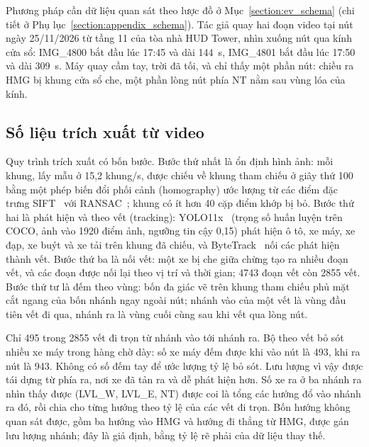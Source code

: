 \documentclass[../main.tex]{subfiles}
\begin{document}
Phương pháp cần dữ liệu quan sát theo lược đồ ở Mục~\ref{section:ev_schema} (chi tiết ở Phụ lục~\ref{section:appendix_schema}). Tác giả quay hai đoạn video tại nút ngày 25/11/2026 từ tầng 11 của tòa nhà HUD Tower, nhìn xuống nút qua kính cửa sổ: IMG\_4800 bắt đầu lúc 17:45 và dài 144~s, IMG\_4801 bắt đầu lúc 17:50 và dài 309~s. Máy quay cầm tay, trời đã tối, và chỉ thấy một phần nút: chiều ra HMG bị khung cửa sổ che, một phần lòng nút phía NT nằm sau vùng lóa của kính.

\subsection{Số liệu trích xuất từ video}

Quy trình trích xuất có bốn bước. Bước thứ nhất là ổn định hình ảnh: mỗi khung, lấy mẫu ở 15,2 khung/s, được chiếu về khung tham chiếu ở giây thứ 100 bằng một phép biến đổi phối cảnh (homography) ước lượng từ các điểm đặc trưng SIFT~\cite{lowe2004sift} với RANSAC~\cite{fischler1981ransac}; khung có ít hơn 40 cặp điểm khớp bị bỏ. Bước thứ hai là phát hiện và theo vết (tracking): YOLO11x~\cite{jocher2024yolo11} (trọng số huấn luyện trên COCO, ảnh vào 1920 điểm ảnh, ngưỡng tin cậy 0,15) phát hiện ô tô, xe máy, xe đạp, xe buýt và xe tải trên khung đã chiếu, và ByteTrack~\cite{zhang2022bytetrack} nối các phát hiện thành vết. Bước thứ ba là nối vết: một xe bị che giữa chừng tạo ra nhiều đoạn vết, và các đoạn được nối lại theo vị trí và thời gian; 4743 đoạn vết còn 2855 vết. Bước thứ tư là đếm theo vùng: bốn đa giác vẽ trên khung tham chiếu phủ mặt cắt ngang của bốn nhánh ngay ngoài nút; nhánh vào của một vết là vùng đầu tiên vết đi qua, nhánh ra là vùng cuối cùng sau khi vết qua lòng nút.

Chỉ 495 trong 2855 vết đi trọn từ nhánh vào tới nhánh ra. Bộ theo vết bỏ sót nhiều xe máy trong hàng chờ dày: số xe máy đếm được khi vào nút là 493, khi ra nút là 943. Không có số đếm tay để ước lượng tỷ lệ bỏ sót. Lưu lượng vì vậy được tái dựng từ phía ra, nơi xe đã tản ra và dễ phát hiện hơn. Số xe ra ở ba nhánh ra nhìn thấy được (LVL\_W, LVL\_E, NT) được coi là tổng các hướng đổ vào nhánh ra đó, rồi chia cho từng hướng theo tỷ lệ của các vết đi trọn. Bốn hướng không quan sát được, gồm ba hướng vào HMG và hướng đi thẳng từ HMG, được gán  lưu lượng nhánh; đây là giả định, bằng tỷ lệ rẽ phải của dữ liệu thay thế.
\end{document}
